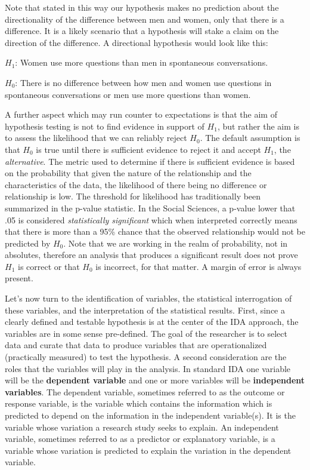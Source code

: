 \documentclass[
  letterpaper,
]{scrbook}
\begin{document}
Note that stated in this way our hypothesis makes no prediction about
the directionality of the difference between men and women, only that
there is a difference. It is a likely scenario that a hypothesis will
stake a claim on the direction of the difference. A directional
hypothesis would look like this:

\(H_1\): Women use more questions than men in spontaneous conversations.

\(H_0\): There is no difference between how men and women use questions
in spontaneous conversations or men use more questions than women.

A further aspect which may run counter to expectations is that the aim
of hypothesis testing is not to find evidence in support of \(H_1\), but
rather the aim is to assess the likelihood that we can reliably reject
\(H_0\). The default assumption is that \(H_0\) is true until there is
sufficient evidence to reject it and accept \(H_1\), the
\emph{alternative}. The metric used to determine if there is sufficient
evidence is based on the probability that given the nature of the
relationship and the characteristics of the data, the likelihood of
there being no difference or relationship is low. The threshold for
likelihood has traditionally been summarized in the p-value statistic.
In the Social Sciences, a p-value lower that .05 is considered
\emph{statistically significant} which when interpreted correctly means
that there is more than a 95\% chance that the observed relationship
would not be predicted by \(H_0\). Note that we are working in the realm
of probability, not in absolutes, therefore an analysis that produces a
significant result does not prove \(H_1\) is correct or that \(H_0\) is
incorrect, for that matter. A margin of error is always present.

Let's now turn to the identification of variables, the statistical
interrogation of these variables, and the interpretation of the
statistical results. First, since a clearly defined and testable
hypothesis is at the center of the IDA approach, the variables are in
some sense pre-defined. The goal of the researcher is to select data and
curate that data to produce variables that are operationalized
(practically measured) to test the hypothesis. A second consideration
are the roles that the variables will play in the analysis. In standard
IDA one variable will be the \textbf{dependent variable} and one or more
variables will be \textbf{independent variables}. The dependent
variable, sometimes referred to as the outcome or response variable, is
the variable which contains the information which is predicted to depend
on the information in the independent variable(s). It is the variable
whose variation a research study seeks to explain. An independent
variable, sometimes referred to as a predictor or explanatory variable,
is a variable whose variation is predicted to explain the variation in
the dependent variable.
\end{document}
